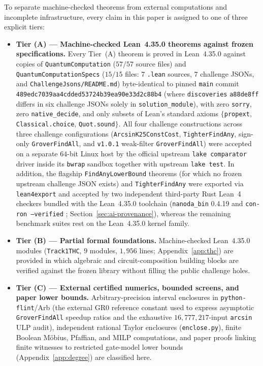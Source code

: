 \documentclass[11pt,a4paper]{article}
\theoremstyle{definition}
\theoremstyle{remark}
\begin{document}
To separate machine-checked theorems from external computations and incomplete infrastructure, every claim in this paper is assigned to one of three explicit tiers:
\begin{itemize}
\item \textbf{Tier (A) --- Machine-checked Lean~4.35.0 theorems against frozen specifications.} Every Tier~(A) theorem is proved in Lean~4.35.0 against copies of \texttt{Quantum\allowbreak Computation} (\(57/57\) source files) and \texttt{Quantum\allowbreak Computation\allowbreak Specs} (\(15/15\) files: \(7\) \texttt{.lean} sources, \(7\) challenge JSONs, and \texttt{ChallengeJsons/\allowbreak README.md}) byte-identical to pinned \texttt{main} commit \texttt{489edc70\allowbreak 39aa\allowbreak 4cdd\allowbreak ed53\allowbreak 724b\allowbreak 39ea\allowbreak 90e3\allowbreak 3d2c\allowbreak 88b4} (where \texttt{discoveries} \texttt{a88de8ff} differs in six challenge JSONs solely in \texttt{solution\_\allowbreak module}), with zero \texttt{sorry}, zero \texttt{native\_\allowbreak decide}, and only subsets of Lean's standard axioms \(\{\)\texttt{propext}, \texttt{Classical.\allowbreak choice}, \texttt{Quot.\allowbreak sound}\(\}\). All four challenge constructions across three challenge configurations (\texttt{ArcsinK25\allowbreak ConstCost}, \texttt{Tighter\allowbreak FindAny}, sign-only \texttt{Grover\allowbreak FindAll}, and \texttt{v1.0.1} weak-filter \texttt{Grover\allowbreak FindAll}) were accepted on a separate \(64\)-bit Linux host by the official upstream \texttt{lake comparator} driver inside its \texttt{bwrap} sandbox together with upstream \texttt{lake test}. In addition, the flagship \texttt{FindAny\allowbreak LowerBound} theorems (for which no frozen upstream challenge JSON exists) and \texttt{Tighter\allowbreak FindAny} were exported via \texttt{lean4\allowbreak export} and accepted by two independent third-party Rust Lean~4 checkers bundled with the Lean~4.35.0 toolchain (\texttt{nanoda\_\allowbreak bin} 0.4.19 \cite{nanoda2026} and \texttt{con-ron --verified} \cite{conron2026}; Section~\ref{sec:ai-provenance}), whereas the remaining benchmark suites rest on the Lean~4.35.0 kernel family.
\item \textbf{Tier (B) --- Partial formal foundations.} Machine-checked Lean~4.35.0 modules (\texttt{Track1THC}, \(9\) modules, \(1{,}956\) lines; Appendix~\ref{app:thc}) are provided in which algebraic and circuit-composition building blocks are verified against the frozen library without filling the public challenge holes.
\item \textbf{Tier (C) --- External certified numerics, bounded screens, and paper lower bounds.} Arbitrary-precision interval enclosures in \texttt{python-flint}/Arb \cite{johansson2017} (the external \textrm{GR0} reference constant used to express asymptotic \texttt{GroverFindAll} speedup ratios and the exhaustive \(16{,}777{,}217\)-input \texttt{arcsin} ULP audit), independent rational Taylor enclosures (\texttt{enclose.py}), finite Boolean M\"obius, Pfaffian, and MILP computations, and paper proofs linking finite witnesses to restricted gate-model lower bounds (Appendix~\ref{app:degree}) are classified here.
\end{itemize}
\end{document}

